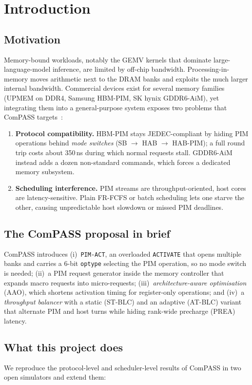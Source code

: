 \documentclass[conference]{IEEEtran}
\newcommand{\cmd}[1]{\texttt{\footnotesize #1}}
\newcommand{\pimact}{\cmd{PIM-ACT}\xspace}
\newcommand{\stblc}{ST-BLC}
\newcommand{\atblc}{AT-BLC}
\begin{document}
\section{Introduction}\label{sec:intro}
\subsection{Motivation}
Memory-bound workloads, notably the GEMV kernels that dominate large-language-model inference, are limited by off-chip bandwidth. Processing-in-memory moves arithmetic next to the DRAM banks and exploits the much larger internal bandwidth. Commercial devices exist for several memory families (UPMEM on DDR4, Samsung HBM-PIM, SK hynix GDDR6-AiM), yet integrating them into a general-purpose system exposes two problems that ComPASS targets~\cite{compass}:

\begin{enumerate}
\item \textbf{Protocol compatibility.} HBM-PIM stays JEDEC-compliant by hiding PIM operations behind \emph{mode switches} (SB $\to$ HAB $\to$ HAB-PIM); a full round trip costs about 350\,ns during which normal requests stall. GDDR6-AiM instead adds a dozen non-standard commands, which forces a dedicated memory subsystem.
\item \textbf{Scheduling interference.} PIM streams are throughput-oriented, host cores are latency-sensitive. Plain FR-FCFS or batch scheduling lets one starve the other, causing unpredictable host slowdown or missed PIM deadlines.
\end{enumerate}

\subsection{The ComPASS proposal in brief}
ComPASS introduces (i)~\pimact, an overloaded \cmd{ACTIVATE} that opens multiple banks and carries a 6-bit \cmd{optype} selecting the PIM operation, so no mode switch is needed; (ii)~a PIM request generator inside the memory controller that expands macro requests into micro-requests; (iii)~\emph{architecture-aware optimisation} (AAO), which shortens activation timing for register-only operations; and (iv)~a \emph{throughput balancer} with a static (\stblc) and an adaptive (\atblc) variant that alternate PIM and host turns while hiding rank-wide precharge (PREA) latency.

\subsection{What this project does}
We reproduce the protocol-level and scheduler-level results of ComPASS in two open simulators and extend them:
\end{document}
